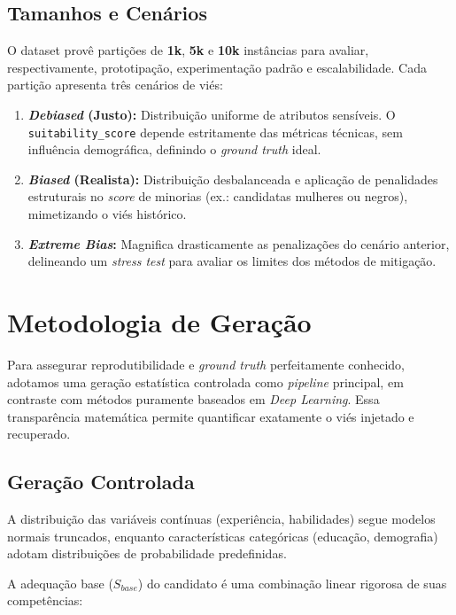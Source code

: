 \documentclass[12pt]{article}
\begin{document}
\subsection{Tamanhos e Cenários}

O dataset provê partições de \textbf{1k}, \textbf{5k} e \textbf{10k} instâncias para avaliar, respectivamente, prototipação, experimentação padrão e escalabilidade. Cada partição apresenta três cenários de viés:

\begin{enumerate}
    \item \textbf{\textit{Debiased} (Justo):} Distribuição uniforme de atributos sensíveis. O \texttt{suitability\_score} depende estritamente das métricas técnicas, sem influência demográfica, definindo o \textit{ground truth} ideal.
    \item \textbf{\textit{Biased} (Realista):} Distribuição desbalanceada e aplicação de penalidades estruturais no \textit{score} de minorias (ex.: candidatas mulheres ou negros), mimetizando o viés histórico.
    \item \textbf{\textit{Extreme Bias}:} Magnifica drasticamente as penalizações do cenário anterior, delineando um \textit{stress test} para avaliar os limites dos métodos de mitigação.
\end{enumerate}

\section{Metodologia de Geração}

Para assegurar reprodutibilidade e \textit{ground truth} perfeitamente conhecido, adotamos uma geração estatística controlada como \textit{pipeline} principal, em contraste com métodos puramente baseados em \textit{Deep Learning}. Essa transparência matemática permite quantificar exatamente o viés injetado e recuperado.

\subsection{Geração Controlada}

A distribuição das variáveis contínuas (experiência, habilidades) segue modelos normais truncados, enquanto características categóricas (educação, demografia) adotam distribuições de probabilidade predefinidas. 

A adequação base ($S_{base}$) do candidato é uma combinação linear rigorosa de suas competências:
\end{document}
